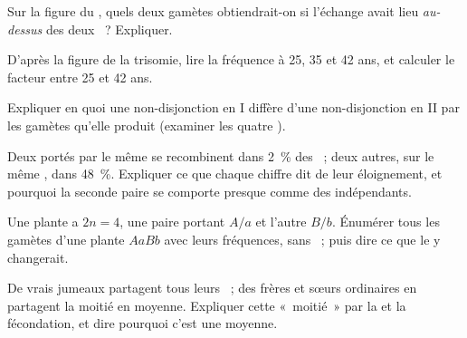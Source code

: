 \begin{exercise}[$\star\star$]\label{exo:g12:meiosis-genetic-shuffling:9}
Sur la figure du , quels deux gamètes obtiendrait-on si
l'échange avait lieu \emph{au-dessus} des deux ~? Expliquer.
\end{exercise}

\begin{exercise}[$\star\star$]\label{exo:g12:meiosis-genetic-shuffling:10}
D'après la figure de la trisomie, lire la fréquence à 25, 35 et 42 ans,
et calculer le facteur entre 25 et 42 ans.
\end{exercise}

\begin{exercise}[$\star\star$]\label{exo:g12:meiosis-genetic-shuffling:11}
Expliquer en quoi une non-disjonction en  I diffère d'une
non-disjonction en  II par les gamètes qu'elle produit (examiner
les quatre ).
\end{exercise}

\begin{exercise}[$\star\star\star$]\label{exo:g12:meiosis-genetic-shuffling:12}
Deux  portés par le même  se recombinent dans 2~\% des
~; deux autres, sur le même , dans 48~\%. Expliquer ce
que chaque chiffre dit de leur éloignement, et pourquoi la seconde
paire se comporte presque comme des  indépendants.
\end{exercise}

\begin{exercise}[$\star\star\star$]\label{exo:g12:meiosis-genetic-shuffling:13}
Une plante a $2n = 4$, une paire portant $A/a$ et l'autre $B/b$.
Énumérer tous les gamètes d'une plante $AaBb$ avec leurs fréquences,
sans ~; puis dire ce que le  y changerait.
\end{exercise}

\begin{exercise}[$\star\star\star$]\label{exo:g12:meiosis-genetic-shuffling:14}
De vrais jumeaux partagent tous leurs ~; des frères et sœurs
ordinaires en partagent la moitié en moyenne. Expliquer cette
«~moitié~» par la  et la fécondation, et dire pourquoi c'est une
moyenne.
\end{exercise}

